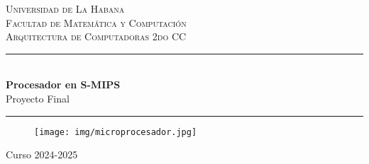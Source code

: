\documentclass[12pt]{amsart}
\begin{document}
	\newcommand{\Efecto}[2]{Efectos de la instrucción:
		
		\medskip
		\begin{itemize}
			{#1}
		\end{itemize}
		\medskip
		Ensamblador:
		
		\medskip
		\texttt{\qquad\ #2}}
	
	\newcommand{\pto}{\item[]}
	
	\newcommand{\Rs}{$R_s$}
	\newcommand{\Rt}{$R_t$}
	\newcommand{\Rd}{$R_d$}
	\newcommand{\nop}{$PC \alloc [PC] + 4$}
	
	\newcommand{\ReadTime}{\texttt{Read Time}}
	\newcommand{\RT}{\texttt{RT}}
	\newcommand{\WriteTime}{\texttt{Write Time}}
	\newcommand{\WT}{\texttt{WT}}
	\newcommand{\ADDR}{\texttt{ADDR}}
	\newcommand{\MASK}{\texttt{MASK}}
	\newcommand{\ChipSelect}{\texttt{Chip Select}}
	\newcommand{\CS}{\texttt{CS}}
	
	\thispagestyle{empty}
	\newcommand{\HRule}{\rule{\linewidth}{0.5mm}}
	\hspace{1cm}
	\vspace{1cm}
	\begin{center}
	\textsc{\huge Universidad de La Habana}\\[2.0cm]
	\textsc{\Large Facultad de Matemática y Computación}\\[1.0cm]
	\textsc{\Large Arquitectura de Computadoras 2do CC}\\[1.0cm]
	
	\HRule\\[1.4cm]
	{ \huge \bfseries Procesador en S-MIPS}\\\vspace{0.2cm}
	{ \large Proyecto Final}\\\vspace{0.3cm} %
	\HRule
	\vspace{1cm}
	\begin{figure}[H]
		\texttt{[image: img/microprocesador.jpg]}
	\end{figure}

	\vspace{85px}
	Curso 2024-2025

	

	\end{center}
	
	\vspace{2.9cm}
	
\end{document}
